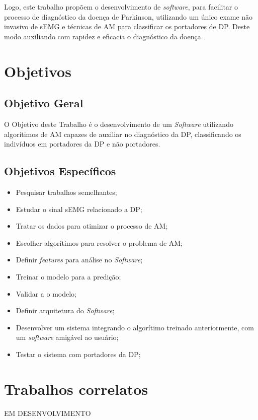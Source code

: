 Logo, este trabalho propõem o desenvolvimento de \textit{software}, para facilitar o processo de diagnóstico da doença de Parkinson, utilizando um único exame não invasivo de sEMG e técnicas de AM para classificar os portadores de DP. Deste modo auxiliando com rapidez e eficacia o diagnóstico da doença.

\section{Objetivos}
\subsection{Objetivo Geral}
O Objetivo deste Trabalho é o desenvolvimento de um \textit{Software} utilizando algorítimos de AM capazes de auxiliar no diagnóstico da DP, classificando os indivíduos em portadores da DP e não portadores.

\subsection{Objetivos Específicos}
\begin{itemize}
    \item Pesquisar trabalhos semelhantes;
    \item Estudar o sinal sEMG relacionado a DP;
    \item Tratar os dados para otimizar o processo de AM;
    \item Escolher algorítimos para resolver o problema de AM;
    \item Definir \textit{features} para análise no \textit{Software};
    \item Treinar o modelo para a predição;
    \item Validar a o modelo;
    \item Definir arquitetura do \textit{Software};
    \item Desenvolver um sistema integrando o algorítimo treinado anteriormente, com um \textit{software} amigável ao usuário;
    \item Testar o sistema com portadores da DP;
\end{itemize}

\section{Trabalhos correlatos}
EM DESENVOLVIMENTO